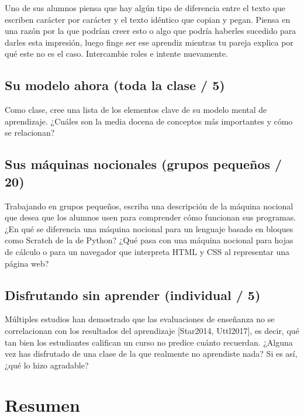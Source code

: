 \documentclass[
]{book}
\begin{document}
Uno de sus alumnos piensa que hay algún tipo de diferencia entre el texto que escriben carácter por carácter y el texto idéntico que copian y pegan. Piensa en una razón por la que podrían creer esto o algo que podría haberles sucedido para darles esta impresión, luego finge ser ese aprendiz mientras tu pareja explica por qué este no es el caso. Intercambie roles e intente nuevamente.

\hypertarget{su-modelo-ahora-toda-la-clase-5}{%
\subsection{Su modelo ahora (toda la clase / 5)}\label{su-modelo-ahora-toda-la-clase-5}}

Como clase, cree una lista de los elementos clave de su modelo mental de aprendizaje. ¿Cuáles son la media docena de conceptos más importantes y cómo se relacionan?

\hypertarget{sus-muxe1quinas-nocionales-grupos-pequeuxf1os-20}{%
\subsection{Sus máquinas nocionales (grupos pequeños / 20)}\label{sus-muxe1quinas-nocionales-grupos-pequeuxf1os-20}}

Trabajando en grupos pequeños, escriba una descripción de la máquina nocional que desea que los alumnos usen para comprender cómo funcionan sus programas. ¿En qué se diferencia una máquina nocional para un lenguaje basado en bloques como Scratch de la de Python? ¿Qué pasa con una máquina nocional para hojas de cálculo o para un navegador que interpreta HTML y CSS al representar una página web?

\hypertarget{disfrutando-sin-aprender-individual-5}{%
\subsection{Disfrutando sin aprender (individual / 5)}\label{disfrutando-sin-aprender-individual-5}}

Múltiples estudios han demostrado que las evaluaciones de enseñanza no se correlacionan con los resultados del aprendizaje {[}Star2014, Uttl2017{]}, es decir, qué tan bien los estudiantes califican un curso no predice cuánto recuerdan. ¿Alguna vez has disfrutado de una clase de la que realmente no aprendiste nada? Si es así, ¿qué lo hizo agradable?

\hypertarget{resumen}{%
\section{Resumen}\label{resumen}}
\end{document}
